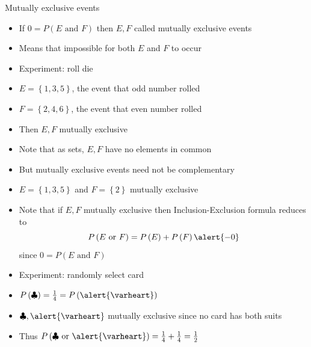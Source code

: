 \documentclass[handout]{beamer}
\theoremstyle{definition}
\begin{document}
\begin{frame}{Mutually exclusive events}
\begin{itemize}
\item If $0=P\left(\text{$E$ and $F$}\right)$
then $E,F$ called \alert{mutually exclusive events}
\item Means that impossible for \alert{both} $E$ and $F$ to occur
\end{itemize}
\begin{example}
\begin{itemize}
\item Experiment: roll die
\item $E=\left\{1,3,5\right\}$, the event
that odd number rolled
\item $F=\left\{2,4,6\right\}$, the event
that even number rolled
\item Then $E,F$ mutually exclusive
\item Note that as sets, $E,F$ have \alert{no elements} in common
\end{itemize}
\end{example}
\begin{example}
\begin{itemize}
\item But mutually exclusive events need not be \alert{complementary}
\item $E=\left\{1,3,5\right\}$ and $F=\left\{2\right\}$
mutually exclusive
\end{itemize}
\end{example}
\end{frame}

\begin{frame}
\begin{itemize}
\item Note that if $E,F$ mutually exclusive then Inclusion-Exclusion
formula reduces to
\[P\left(\text{$E$ or $F$}\right)=P\left(E\right)
+P\left(F\right)\alert{-0}\]
since $0=P\left(\text{$E$ and $F$}\right)$
\end{itemize}
\begin{example}
\begin{itemize}
\item Experiment: randomly select card
\item $P\left(\clubsuit\right)=\frac{1}{4}=P\left(\alert{\varheart}\right)$
\item $\clubsuit,\alert{\varheart}$ mutually exclusive
since no card has \alert{both} suits
\item Thus $P\left(\text{$\clubsuit$ or $\alert{\varheart}$}\right)
=\frac{1}{4}+\frac{1}{4}=\frac{1}{2}$
\end{itemize}
\end{example}
\end{frame}
\end{document}
